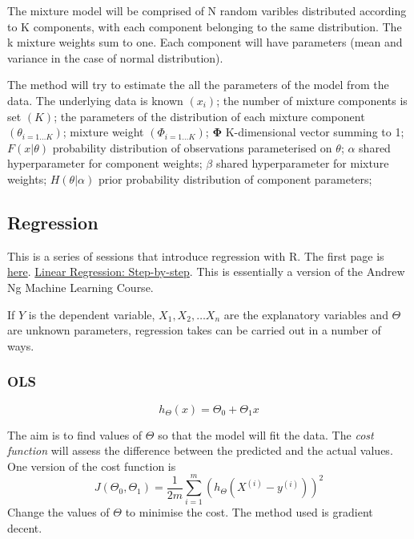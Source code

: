 \documentclass[12pt, a4paper, oneside]{article}\usepackage[]{graphicx}\usepackage[]{color}
\begin{document}
The mixture model will be comprised of N random varibles distributed according to K components, with each component belonging to the same distribution. The k mixture weights sum to one. Each component will have parameters (mean and variance in the case of normal distribution).  

The method will try to estimate the all the parameters of the model from the data.  The underlying data is known $(x_i)$; the number of mixture components is set $(K)$; the parameters of the distribution of each mixture component $(\theta_{i=1\dots K})$; mixture weight $(\Phi_{i = 1\dots K})$; $\mathbf{\Phi}$ K-dimensional vector summing to 1; $F(x|\theta)$ probability distribution of observations parameterised on $\theta$; $\alpha$ shared hyperparameter for component weights; $\beta$ shared hyperparameter for mixture weights; $H(\theta|\alpha)$ prior probability distribution of component parameters; 


\subsection{Regression}
This is a series of sessions that introduce regression with R.  The first page is \href{http://pingax.com/2013/11/}{here}.  \href{http://pingax.com/linear-regression-with-r-step-by-step-implementation-part-1/}{Linear Regression: Step-by-step}. This is essentially a version of the Andrew Ng Machine Learning Course.  

If $Y$ is the dependent variable, $X_1, X_2, \dots X_n$ are the explanatory variables and $\Theta$ are unknown parameters, regression takes can be carried out in a number of ways. 

\subsubsection{OLS}
\begin{equation}
h_{\Theta}(x) = \Theta_0 + \Theta_1 x
\end{equation}

The aim is to find values of $\Theta$ so that the model will fit the data.  The \emph{cost function} will assess the difference between the predicted and the actual values. One version of the cost function is 
\begin{equation}
J(\Theta_0, \Theta_1) = \frac{1}{2m} \sum_{i=1}^m (h_{\Theta}(X^{(i)} - y^{(i)}))^2
\end{equation}
Change the values of $\Theta$ to minimise the cost. The method used is gradient decent. 
\end{document}
